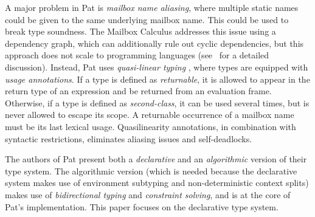 A major problem in Pat is \emph{mailbox name aliasing}, where multiple static
names could be given to the same underlying mailbox name. This could be used to
break type soundness.
The Mailbox Calculus addresses this issue using a dependency graph, which can
additionally rule out cyclic dependencies, but this approach does not scale to
programming languages (see~\cite{fowlerSpecialDeliveryProgramming2023} for a detailed discussion).
Instead, Pat uses \emph{quasi-linear typing}
\cite{kobayashiQuasilinearTypes1999,ennalsLinearTypesPacket2004a}, where types
are equipped with \emph{usage annotations}.  If a type is defined as
\emph{returnable}, it is allowed to appear in the return type of an expression
and be returned from an evaluation frame.
Otherwise, if a type is defined as \emph{second-class},
it can be used several times, but is never allowed to escape its scope.
%
A returnable occurrence of a mailbox name must be its last lexical usage.
%
Quasilinearity annotations, in combination with syntactic restrictions,
eliminates aliasing issues and self-deadlocks.

The authors of Pat present both a \emph{declarative} and an
\emph{algorithmic} version of their type system.  The algorithmic version (which is needed because the
declarative system makes use of environment subtyping and non-deterministic
context splits) makes use of
\emph{bidirectional typing} and \emph{constraint solving}, and is at the core of
Pat's implementation.  This paper focuses on the declarative type
system.
